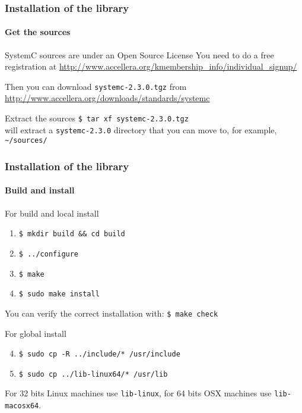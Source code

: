 \begin{frame}
\frametitle{Installation of the library}
\framesubtitle{Get the sources}

\begin{block}{SystemC sources are under an Open Source License}
You need to do a free registration at 
{ \scriptsize
\url{http://www.accellera.org/kmembership_info/individual_signup/}
}

\medskip 
Then you can download \texttt{systemc-2.3.0.tgz} from 
{ \scriptsize
\url{http://www.accellera.org/downloads/standards/systemc}
}
\end{block}
\begin{block}{Extract the sources}
\texttt{\$ tar xf systemc-2.3.0.tgz} \\
will extract a \texttt{systemc-2.3.0} directory that you can move to, for example,
\texttt{\textasciitilde{}/sources/}
\end{block}

\end{frame}

\begin{frame}
\frametitle{Installation of the library}
\framesubtitle{Build and install}

\begin{block}{For build and local install}
\begin{enumerate}
\item \texttt{\$ mkdir build \&\& cd build}
\item \texttt{\$ ../configure}
\item \texttt{\$ make}
\item \texttt{\$ sudo make install}
\end{enumerate}
You can verify the correct installation with: \texttt{\$ make check}
\end{block}
\pause
\begin{block}{For global install}
\begin{enumerate}
\setcounter{enumi}{3}
\item \texttt{\$ sudo cp -R ../include/* /usr/include}
\item \texttt{\$ sudo cp ../lib-linux64/* /usr/lib}
\end{enumerate}
For 32 bits Linux machines use \texttt{lib-linux}, for 64 bits OSX machines use \texttt{lib-macosx64}.
\end{block}

\end{frame}

